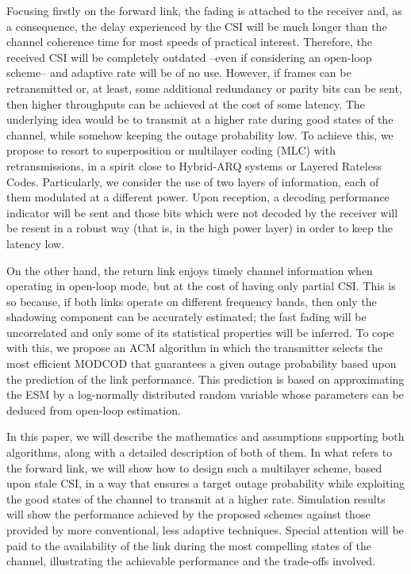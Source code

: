 \documentclass[journal,onecolumn,10pt,a4paper]{IEEEtran}
\begin{document}
Focusing firstly on the forward link, the fading is attached to the receiver and, as a consequence, the delay experienced by the CSI will be much longer than the channel coherence time for most speeds of practical interest. Therefore, the received CSI will be completely outdated --even if considering an open-loop scheme\cite{monk1995}-- and adaptive rate will be of no use. However, if frames can be retransmitted or, at least, some additional redundancy or parity bits can be sent, then higher throughputs can be achieved at the cost of some latency. The underlying idea would be to transmit at a higher rate during good states of the channel, while somehow keeping the outage probability low. To achieve this, we propose to resort to superposition or multilayer coding (MLC) with retransmissions, in a spirit close to Hybrid-ARQ systems or Layered Rateless Codes\cite{Wornell08}. Particularly, we consider the use of two layers of information, each of them modulated at a different power. Upon reception, a decoding performance indicator will be sent and those bits which were not decoded by the receiver will be resent in a robust way (that is, in the high power layer) in order to keep the latency low. 

On the other hand, the return link enjoys timely channel information when operating in open-loop mode, but at the cost of having only partial CSI. This is so because, if both links operate on different frequency bands, then only the shadowing component can be accurately estimated; the fast fading will be uncorrelated and only some of its statistical properties will be inferred. To cope with this, we propose an ACM algorithm in which the transmitter selects the most efficient MODCOD that guarantees a given outage probability based upon the prediction of the link performance. This prediction is based on approximating the ESM by a log-normally distributed random variable whose parameters can be deduced from open-loop estimation. 

In this paper, we will describe the mathematics and assumptions supporting both algorithms, along with a detailed description of both of them. In what refers to the forward link, we will show how to design such a multilayer scheme, based upon stale CSI, in a way that ensures a target outage probability while exploiting the good states of the channel to transmit at a higher rate. Simulation results will show the performance achieved by the proposed schemes against those provided by more conventional, less adaptive techniques. Special attention will be paid to the availability of the link during the most compelling states of the channel, illustrating the achievable performance and the trade-offs involved. 
\end{document}
